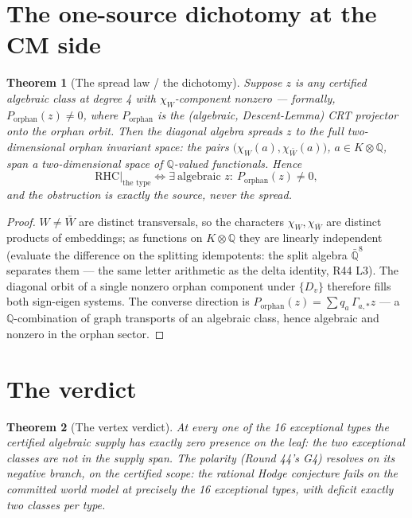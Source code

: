 \documentclass[11pt]{article}
\newtheorem{theorem}{Theorem}
\begin{document}
\section{The one-source dichotomy at the CM side}

\begin{theorem}[The spread law / the dichotomy]\label{thm:dichotomy}
Suppose $z$ is any certified algebraic class at degree 4 with $\chi_W$-component nonzero
--- formally, $P_{\mathrm{orphan}}(z)\neq 0$, where $P_{\mathrm{orphan}}$ is the (algebraic,
Descent-Lemma) CRT projector onto the orphan orbit.  Then the diagonal algebra spreads $z$
to the full two-dimensional orphan invariant space: the pairs
$\bigl(\chi_W(a),\chi_{\bar W}(a)\bigr)$, $a \in K\otimes\mathbb{Q}$, span a
two-dimensional space of $\mathbb{Q}$-valued functionals.  Hence
\[
\mathrm{RHC}\big|_{\text{the type}} \iff \exists\ \text{algebraic } z:\ P_{\mathrm{orphan}}(z)\neq 0,
\]
and the obstruction is exactly the source, never the spread.
\end{theorem}

\begin{proof}
$W\neq\bar W$ are distinct transversals, so the characters $\chi_W,\chi_{\bar W}$ are
distinct products of embeddings; as functions on $K\otimes\mathbb{Q}$ they are linearly
independent (evaluate the difference on the splitting idempotents: the split algebra
$\bar{\mathbb{Q}}^8$ separates them --- the same letter arithmetic as the delta identity,
R44 L3).  The diagonal orbit of a single nonzero orphan component under
$\{D_v\}$ therefore fills both sign-eigen systems.  The converse direction is
$P_{\mathrm{orphan}}(z) = \sum q_a\,\Gamma_{a,*}z$ --- a $\mathbb{Q}$-combination of graph
transports of an algebraic class, hence algebraic and nonzero in the orphan sector.
\end{proof}

\section{The verdict}

\begin{theorem}[The vertex verdict]\label{thm:verdict}
At every one of the 16 exceptional types the certified algebraic supply has exactly zero
presence on the leaf: the two exceptional classes are not in the supply span.  The polarity
(Round 44's G4) resolves on its negative branch, on the certified scope: the rational Hodge
conjecture fails on the committed world model at precisely the 16 exceptional types, with
deficit exactly two classes per type.
\end{theorem}
\end{document}
